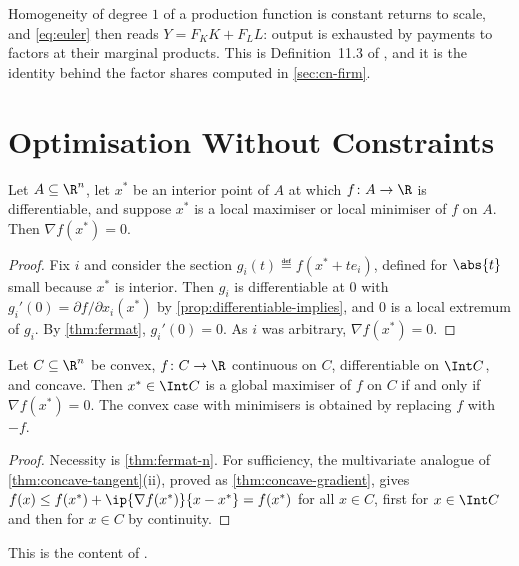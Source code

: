Homogeneity of degree $1$ of a production function is constant returns to scale,
and \eqref{eq:euler} then reads $Y=F_KK+F_LL$: output is exhausted by payments to
factors at their marginal products. This is Definition~11.3 of
\textcite[p.~385]{fukuda2026notes}, and it is the identity behind the factor
shares computed in \autoref{sec:cn-firm}.

\section{Optimisation Without Constraints}\label{sec:cn-foc}

\begin{theorem}\label{thm:fermat-n}
	Let $A\subseteq\R^n$, let $x^\ast$ be an interior point of $A$ at which
	$f\colon A\to\R$ is differentiable, and suppose $x^\ast$ is a local maximiser or
	local minimiser of $f$ on $A$. Then $\nabla f(x^\ast)=0$.
\end{theorem}

\begin{proof}
	Fix $i$ and consider the section $g_i(t)\eqdef f(x^\ast+te_i)$, defined for
	$\abs{t}$ small because $x^\ast$ is interior. Then $g_i$ is differentiable at
	$0$ with $g_i'(0)=\partial f/\partial x_i(x^\ast)$ by
	\autoref{prop:differentiable-implies}, and $0$ is a local extremum of $g_i$. By
	\autoref{thm:fermat}, $g_i'(0)=0$. As $i$ was arbitrary,
	$\nabla f(x^\ast)=0$.
\end{proof}

\begin{theorem}\label{thm:foc-concave-n}
	Let $C\subseteq\R^n$ be convex, $f\colon C\to\R$ continuous on $C$,
	differentiable on $\Int C$, and concave. Then $x^\ast\in\Int C$ is a global
	maximiser of $f$ on $C$ if and only if $\nabla f(x^\ast)=0$. The convex case
	with minimisers is obtained by replacing $f$ with $-f$.
\end{theorem}

\begin{proof}
	Necessity is \autoref{thm:fermat-n}. For sufficiency, the multivariate
	analogue of \autoref{thm:concave-tangent}(ii), proved as
	\autoref{thm:concave-gradient}, gives
	$f(x)\leq f(x^\ast)+\ip{\nabla f(x^\ast)}{x-x^\ast}=f(x^\ast)$ for all
	$x\in C$, first for $x\in\Int C$ and then for $x\in C$ by continuity.
\end{proof}

This is the content of \autocite[slide 52]{fukuda2026calculus}.

